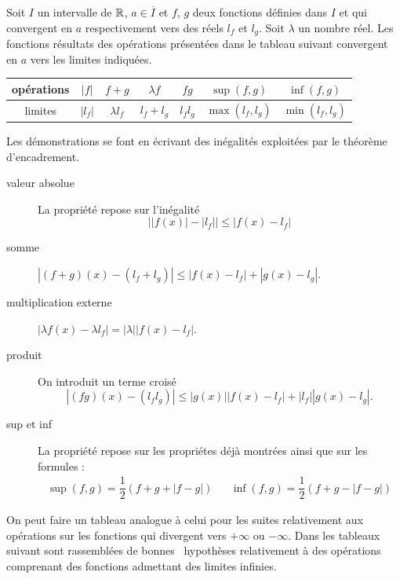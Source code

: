 \begin{thm}
 Soit  $I$ un intervalle de $\mathbb{R}$, $a\in\overline{I}$ et $f$, $g$ deux fonctions définies dans $I$ et qui convergent en $a$ respectivement vers des réels $l_f$ et $l_g$. Soit $\lambda$ un nombre réel. Les fonctions résultats des opérations présentées dans le tableau suivant convergent en $a$ vers les limites indiquées.
\begin{center}
\renewcommand{\arraystretch}{1.5}
\begin{tabular}{c|c|c|c|c|c|c|}
opérations  & $|f|$ & $f+g$ &  $\lambda f$ & $fg$ & $\sup(f,g)$ & $\inf(f,g)$\\ \hline
limites & $|l_f|$ & $\lambda l_f$ & $l_f+l_g$ & $l_fl_g$ & $\max(l_f,l_g)$ & $\min(l_f,l_g)$
\end{tabular}
\end{center}
\end{thm}
\begin{demo}
Les démonstrations se font en écrivant des inégalités exploitées par le théorème d'encadrement.
 \begin{description}
 \item[valeur absolue] La propriété repose sur l'inégalité
\begin{displaymath}
 \left\vert |f(x)| -|l_f|\right\vert \leq |f(x) - l_f|
\end{displaymath}
\item[somme] $\left| (f+g)(x) - (l_f+l_g)\right| \leq  \left| f(x) - l_f\right| + \left| g(x) - l_g \right|$.
\item[multiplication externe] $\left|\lambda f(x) - \lambda l_f\right| = |\lambda|\left|f(x) - l_f\right|$.
\item[produit] On introduit un terme croisé
\[
 \left| (fg)(x) - (l_fl_g)\right| \leq |g(x)| \left| f(x) - l_f\right| + |l_f|\left| g(x) - l_g \right|.
\]

\item[sup et inf] La propriété repose sur les propriétes déjà montrées ainsi que sur les formules :
\begin{align*}
 \sup(f,g) = \dfrac{1}{2}(f+g+|f-g|) & & \inf(f,g) = \dfrac{1}{2}(f+g - |f-g|)
\end{align*}
\end{description}
\end{demo}
On peut faire un tableau analogue à celui pour les suites relativement aux opérations sur les fonctions qui divergent vers $+\infty$ ou $-\infty$.
Dans les tableaux suivant sont rassemblées de \og bonnes\fg~ hypothèses relativement à des opérations comprenant des fonctions admettant des limites infinies.
